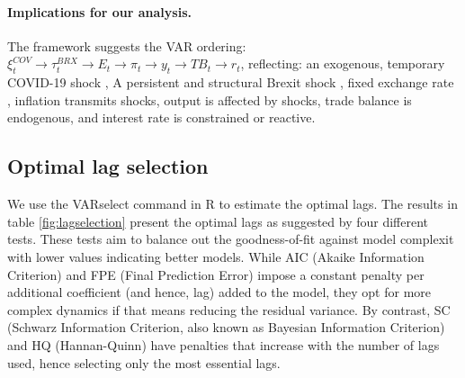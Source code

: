 \documentclass[
]{article}
\begin{document}
\paragraph*{Implications for our analysis.} 
The framework suggests the VAR ordering: 
\( \xi_t^{COV} \rightarrow \tau_t^{BRX} \rightarrow E_t \rightarrow \pi_t \rightarrow y_t \rightarrow TB_t \rightarrow r_t \), reflecting:
an exogenous, temporary COVID-19 shock %
, A persistent and structural Brexit shock %
, fixed exchange rate %
 , inflation transmits shocks,%
output is affected by shocks,%
trade balance is endogenous,%
and interest rate is constrained or reactive.%

\subsection{Optimal lag selection}

We use the VARselect command in R to estimate the optimal lags. The results in 
table \ref{fig:lagselection} present the optimal lags as suggested by four different tests. These
tests aim to balance out the goodness-of-fit against model complexit with lower 
values indicating better models. While AIC 
(Akaike Information Criterion) and FPE (Final Prediction Error) impose a constant
penalty per additional coefficient (and hence, lag) added to the model, they opt
for more complex dynamics if that means reducing the residual variance. 
By contrast, SC (Schwarz Information Criterion, also known as Bayesian Information Criterion) 
and HQ (Hannan-Quinn) have penalties that increase with the number of lags used, 
hence selecting only the most essential lags. 
\end{document}
